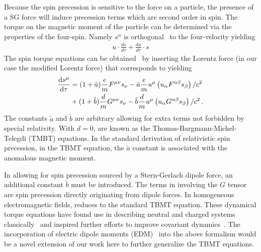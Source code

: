 Because the spin precession is sensitive to the force on a particle, the presence of a SG force will induce precession terms which are second order in spin. The torque on the magnetic moment of the particle can be determined via the properties of the four-spin. Namely $s^{\alpha}$ is orthogonal~\citep{schwinger1974spin} to the four-velocity yielding
\begin{gather}
    \label{bpot:4}
    u\cdot\frac{ds}{d\tau}+\frac{du}{d\tau}\cdot s
\end{gather}
The spin torque equations can be obtained~\citep{Thomas:1926dy,Bargmann:1959gz} by inserting the Lorentz force (in our case the modified Lorentz force) that corresponds to  yielding
\begin{alignat}{1}
  \notag\frac{\mathrm{d}s^{\mu}}{\mathrm{d}\tau}&=(1+\tilde{a})\frac{e}{m}F^{\mu\nu}s_{\nu}-\tilde{a}\frac{e}{m}u^{\mu}\left(u_{\alpha}F^{\alpha\beta}s_{\beta}\right)/c^{2}\\
  \label{LSG03}&+(1+\tilde{b})\frac{d}{m}G^{\mu\nu}s_{\nu}-\tilde{b}\frac{d}{m}u^{\mu}\left(u_{\alpha}G^{\alpha\beta}s_{\beta}\right)/c^{2}\,.
\end{alignat}
The constants $\tilde{a}$ and $\tilde{b}$ are arbitrary allowing for extra terms not forbidden by special relativity. With $d=0$,  are known as the Thomas-Bargmann-Michel-Telegdi (TMBT) equations. In the standard derivation of relativistic spin precession, in the TBMT equation, the $\tilde{a}$ constant is associated with the anomalous magnetic moment.

In allowing for spin precession sourced by a Stern-Gerlach dipole force, an additional constant $\tilde{b}$ must be introduced. The terms in  involving the $G$ tensor are spin precession directly originating from dipole forces. In homogeneous electromagnetic fields,  reduces to the standard TBMT equation. These dynamical torque equations have found use in describing neutral and charged systems classically~\citep{Formanek:2019cga,Formanek:2021mcp} and inspired further efforts to improve covariant dynamics~\citep{Formanek:2020ojr}. The incorporation of electric dipole moments (EDM)~\citep{Asenjo:2023mon} into the above formalism would be a novel extension of our work here to further generalize the TBMT equations.

